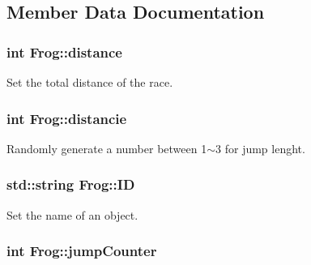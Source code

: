 \subsection{Member Data Documentation}
\subsubsection[{\texorpdfstring{distance}{distance}}]{\setlength{\rightskip}{0pt plus 5cm}int Frog\+::distance\hspace{0.3cm}{\ttfamily [static]}}\hypertarget{classFrog_a5846a1d18091a9d5409cd7ab3a93abdf}{}\label{classFrog_a5846a1d18091a9d5409cd7ab3a93abdf}


Set the total distance of the race. 

\subsubsection[{\texorpdfstring{distancie}{distancie}}]{\setlength{\rightskip}{0pt plus 5cm}int Frog\+::distancie\hspace{0.3cm}{\ttfamily [private]}}\hypertarget{classFrog_acfa2696ff1e9483acfc3c60941a9a540}{}\label{classFrog_acfa2696ff1e9483acfc3c60941a9a540}


Randomly generate a number between 1$\sim$3 for jump lenght. 

\subsubsection[{\texorpdfstring{ID}{ID}}]{\setlength{\rightskip}{0pt plus 5cm}std\+::string Frog\+::\+ID\hspace{0.3cm}{\ttfamily [private]}}\hypertarget{classFrog_ac2fe938591f6471cbea049b87dbc2a2e}{}\label{classFrog_ac2fe938591f6471cbea049b87dbc2a2e}


Set the name of an object. 

\subsubsection[{\texorpdfstring{jump\+Counter}{jumpCounter}}]{\setlength{\rightskip}{0pt plus 5cm}int Frog\+::jump\+Counter\hspace{0.3cm}{\ttfamily [private]}}\hypertarget{classFrog_a3d38d6ca4384c9d2cb4b770d93cf7dd5}{}\label{classFrog_a3d38d6ca4384c9d2cb4b770d93cf7dd5}


